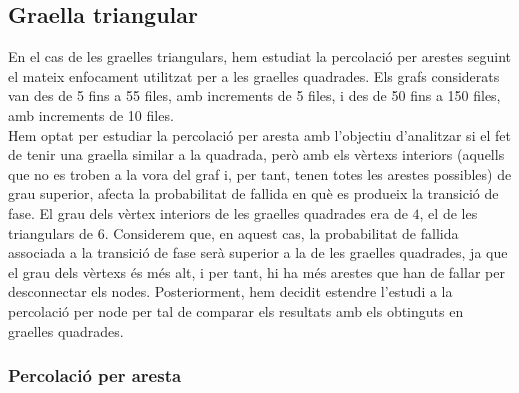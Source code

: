 \documentclass[a4paper]{article}
\begin{document}
	
	
	\subsection{Graella triangular}
	
	En el cas de les graelles triangulars, hem estudiat la percolació per arestes seguint el mateix enfocament utilitzat per a les graelles quadrades. Els grafs considerats van des de 5 fins a 55 files, amb increments de 5 files, i des de 50 fins a 150 files, amb increments de 10 files. \\
	
	Hem optat per estudiar la percolació per aresta amb l'objectiu d'analitzar si el fet de tenir una graella similar a la quadrada, però amb els vèrtexs interiors (aquells que no es troben a la vora del graf i, per tant, tenen totes les arestes possibles) de grau superior, afecta la probabilitat de fallida en què es produeix la transició de fase. El grau dels vèrtex interiors de les graelles quadrades era de $4$, el de les triangulars de $6$. Considerem que, en aquest cas, la probabilitat de fallida associada a la transició de fase serà superior a la de les graelles quadrades, ja que el grau dels vèrtexs és més alt, i per tant, hi ha més arestes que han de fallar per desconnectar els nodes. Posteriorment, hem decidit estendre l'estudi a la percolació per node per tal de comparar els resultats amb els obtinguts en graelles quadrades. \\
	
	
	
	\subsubsection{Percolació per aresta}
	
\end{document}
